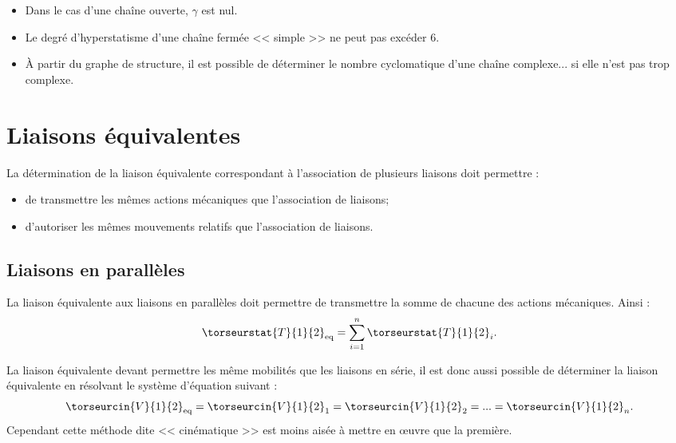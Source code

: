 \begin{remarque}[s]
\begin{itemize}
\item Dans le cas d'une chaîne ouverte, $\gamma$ est nul. 
\item Le degré d'hyperstatisme d'une chaîne fermée << simple >> ne peut pas excéder 6.
\item À partir du graphe de structure, il est possible de déterminer le nombre cyclomatique d'une chaîne complexe... si elle n'est pas trop complexe.

\end{itemize}
\end{remarque}

\section{Liaisons équivalentes}
\begin{obj}
La détermination de la liaison équivalente correspondant à l'association de plusieurs liaisons doit permettre : 
\begin{itemize}
\item de transmettre les mêmes actions mécaniques que l'association de liaisons;
\item d'autoriser les mêmes mouvements relatifs que l'association de liaisons.
\end{itemize}
\end{obj}

\subsection{Liaisons en parallèles}
\begin{methode}
La liaison équivalente aux liaisons en parallèles doit permettre de transmettre la somme de chacune des actions mécaniques. Ainsi : 
$$
\torseurstat{T}{1}{2}_{\text{eq}} = \sum\limits_{i=1}^{n}\torseurstat{T}{1}{2}_{i}.
$$ 
\end{methode}

\begin{remarque}
La liaison équivalente devant permettre les même mobilités que les liaisons en série, il est donc aussi possible de déterminer la liaison équivalente en résolvant le système d'équation suivant : 
$$
\torseurcin{V}{1}{2}_{\text{eq}} 
= \torseurcin{V}{1}{2}_1
= \torseurcin{V}{1}{2}_2
=...
= \torseurcin{V}{1}{2}_n.
$$ 
Cependant cette méthode dite << cinématique >> est moins aisée à mettre en \oe{}uvre que la première.

\end{remarque}
